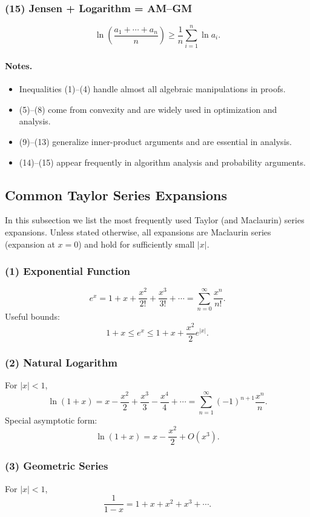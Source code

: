 \documentclass[10pt]{article}
\theoremstyle{definition}
\begin{document}
\subsubsection*{(15) Jensen + Logarithm = AM--GM}
\[
\ln\!\left(\frac{a_1+\cdots+a_n}{n}\right)
\ge
\frac{1}{n}\sum_{i=1}^n \ln a_i.
\]

\paragraph{Notes.}
\begin{itemize}
    \item Inequalities (1)--(4) handle almost all algebraic manipulations in proofs.
    \item (5)--(8) come from convexity and are widely used in optimization and analysis.
    \item (9)--(13) generalize inner-product arguments and are essential in analysis.
    \item (14)--(15) appear frequently in algorithm analysis and probability arguments.
\end{itemize}
\subsection{Common Taylor Series Expansions}

In this subsection we list the most frequently used Taylor (and Maclaurin)
series expansions.  Unless stated otherwise, all expansions are Maclaurin
series (expansion at \(x=0\)) and hold for sufficiently small \(|x|\).

\subsubsection*{(1) Exponential Function}
\[
e^x
    = 1 + x + \frac{x^2}{2!} + \frac{x^3}{3!} + \cdots
    = \sum_{n=0}^\infty \frac{x^n}{n!}.
\]
Useful bounds:
\[
1+x \le e^x \le 1 + x + \frac{x^2}{2}e^{|x|}.
\]

\subsubsection*{(2) Natural Logarithm}
For \(|x|<1\),
\[
\ln(1+x)
    = x - \frac{x^2}{2} + \frac{x^3}{3} - \frac{x^4}{4} + \cdots
    = \sum_{n=1}^\infty (-1)^{n+1}\frac{x^n}{n}.
\]
Special asymptotic form:
\[
\ln(1+x) = x - \frac{x^2}{2} + O(x^3).
\]

\subsubsection*{(3) Geometric Series}
For \(|x|<1\),
\[
\frac{1}{1-x}
    = 1 + x + x^2 + x^3 + \cdots.
\]
\end{document}
